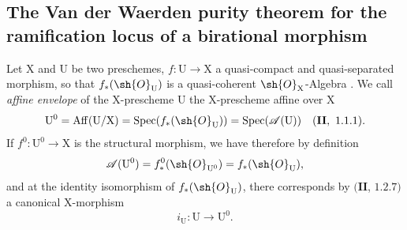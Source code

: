 \subsection{The Van der Waerden purity theorem for the ramification locus of a birational morphism}
\label{subsection:IV.21.12}
\label{IV.21.12}

\begin{env}[21.12.1]
\label{IV.21.12.1}
Let $\mathrm{X}$ and $\mathrm{U}$ be two preschemes, $f:\mathrm{U}\to\mathrm{X}$ a quasi-compact and quasi-separated morphism, so that $f_*(\sh{O}_{\mathrm{U}})$ is a quasi-coherent $\sh{O}_{\mathrm{X}}$-Algebra .
We call \emph{affine envelope} of the $\mathrm{X}$-prescheme $\mathrm{U}$ the $\mathrm{X}$-prescheme affine over $\mathrm{X}$
\[
  \mathrm{U}^0=\operatorname{Aff}(\mathrm{U}/\mathrm{X})=\operatorname{Spec}(f_*(\sh{O}_{\mathrm{U}}))=\operatorname{Spec}(\mathscr{A}(\mathrm{U}))\quad(\mathbf{II},~1.1.1).
\]
If $f^0:\mathrm{U}^0\to\mathrm{X}$ is the structural morphism, we have therefore by definition
\[
  \mathscr{A}(\mathrm{U}^0)=f_*^0(\sh{O}_{\mathrm{U}^0})=f_*(\sh{O}_{\mathrm{U}}),
\]
and at the identity isomorphism of $f_*(\sh{O}_{\mathrm{U}})$, there corresponds by $(\mathbf{II}$, $1.2.7)$ a canonical $\mathrm{X}$-morphism
\[
\label{IV.21.12.1.1}
  i_{\mathrm{U}}:\mathrm{U}\to\mathrm{U}^0.
  \tag{21.12.1.1}
\]


\end{env}
